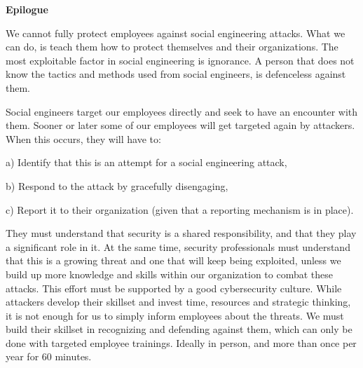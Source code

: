 \textbf{Epilogue}

We cannot fully protect employees against social engineering attacks. What we can do, is teach them how to protect themselves and their organizations. The most exploitable factor in social engineering is ignorance. A person that does not know the tactics and methods used from social engineers, is defenceless against them.

Social engineers target our employees directly and seek to have an encounter with them. Sooner or later some of our employees will get targeted again by attackers. When this occurs, they will have to:

a) Identify that this is an attempt for a social engineering attack,

b) Respond to the attack by gracefully disengaging,

c) Report it to their organization (given that a reporting mechanism is in place).

They must understand that security is a shared responsibility, and that they play a significant role in it. At the same time, security professionals must understand that this is a growing threat and one that will keep being exploited, unless we build up more knowledge and skills within our organization to combat these attacks. This effort must be supported by a good cybersecurity culture. While attackers develop their skillset and invest time, resources and strategic thinking, it is not enough for us to simply inform employees about the threats. We must build their skillset in recognizing and defending against them, which can only be done with targeted employee trainings. Ideally in person, and more than once per year for 60 minutes.

